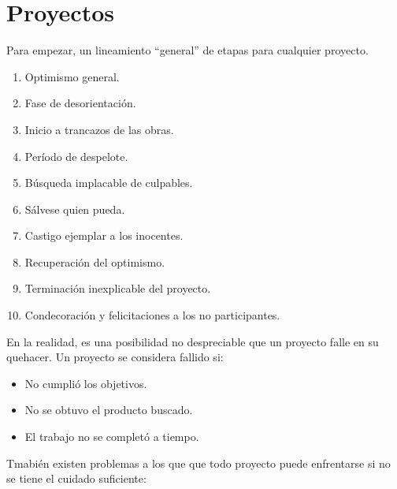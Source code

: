 \section*{Proyectos}

Para empezar, un lineamiento ``general'' de etapas para
cualquier proyecto.

\begin{enumerate}
  \item{Optimismo general.}
  \item{Fase de desorientación.}
  \item{Inicio a trancazos de las obras.}
  \item{Período de despelote.}
  \item{Búsqueda implacable de culpables.}
  \item{Sálvese quien pueda.}
  \item{Castigo ejemplar a los inocentes.}
  \item{Recuperación del optimismo.}
  \item{Terminación inexplicable del proyecto.}
  \item{Condecoración y felicitaciones a los no
  participantes.}
\end{enumerate}

En la realidad, es una posibilidad no despreciable que un
proyecto falle en su quehacer. Un proyecto se considera
fallido si:

\begin{itemize}
\item{No cumplió los objetivos.}
\item{No se obtuvo el producto buscado.}
\item{El trabajo no se completó a tiempo.}
\end{itemize}

Tmabién existen problemas a los que que todo proyecto puede
enfrentarse si no se tiene el cuidado suficiente:

